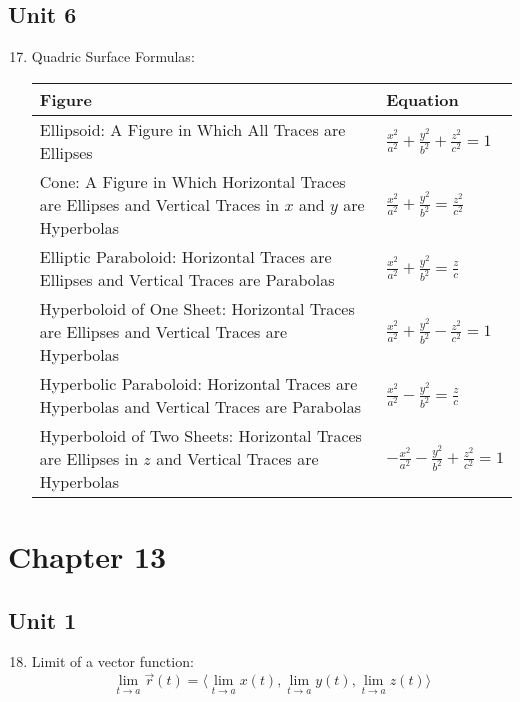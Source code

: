 \documentclass[12pt]{article}
\begin{document}
\subsection{Unit 6}

\begin{enumerate}
    \setcounter{enumi}{16}

  \item Quadric Surface Formulas:
    \begin{center}
\begin{tabular}{|p{}||p{}|}

\hline
  Figure & Equation \\
\hline
Ellipsoid: A Figure in Which All Traces are Ellipses & $\frac{x^2}{a^2}+\frac{y^2}{b^2}+\frac{z^2}{c^2}=1$\\
\hline
  Cone: A Figure in Which Horizontal Traces are Ellipses and Vertical Traces in $x$ and $y$ are Hyperbolas & $\frac{x^2}{a^2}+\frac{y^2}{b^2}=\frac{z^2}{c^2}$\\
\hline
Elliptic Paraboloid: Horizontal Traces are Ellipses and Vertical Traces are Parabolas & $\frac{x^2}{a^2}+\frac{y^2}{b^2}=\frac{z}{c}$\\ 
\hline
Hyperboloid of One Sheet: Horizontal Traces are Ellipses and Vertical Traces are Hyperbolas & $\frac{x^2}{a^2}+\frac{y^2}{b^2}-\frac{z^2}{c^2}=1$\\ 
\hline
Hyperbolic Paraboloid: Horizontal Traces are Hyperbolas and Vertical Traces are Parabolas & $\frac{x^2}{a^2}-\frac{y^2}{b^2}=\frac{z}{c}$\\
\hline
Hyperboloid of Two Sheets: Horizontal Traces are Ellipses in $z$ and Vertical Traces are Hyperbolas & $-\frac{x^2}{a^2}-\frac{y^2}{b^2}+\frac{z^2}{c^2}=1$\\
\hline

\end{tabular}
\end{center}
\end{enumerate}

\section{Chapter 13}

\subsection{Unit 1}

\begin{enumerate}
    \setcounter{enumi}{17}
  \item Limit of a vector function:
    $$\lim_{t\to a}\overrightarrow{r}(t)=\langle \lim_{t\to a}x(t), \lim_{t\to a} y(t), \lim_{t\to a}z(t)\rangle$$
\end{enumerate}
\end{document}
